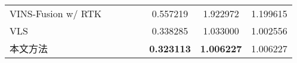 \begin{table}
\begin{tabular}{lccccccc}
VINS-Fusion w/ RTK &                                                                                &                     &                     &                     & 0.557219          & 1.922972          & 1.199615          \\
VLS                &                                                                                &                     &                     &                     & 0.338285          & 1.033000          & 1.002556          \\
本文方法               &                                                                                &                     &                     &                     & \cellcolor[HTML]{FFCCC9}\textbf{0.323113} & \cellcolor[HTML]{FFCCC9}\textbf{1.006227} & 1.006227          \\ \bottomrule
\end{tabular}
\label{tab:loc_4seasons_nh23}
\end{table}


